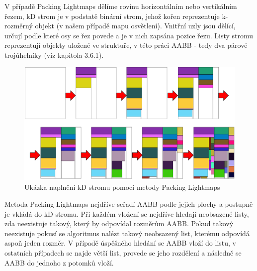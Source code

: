 \documentclass[11pt,twoside,a4paper]{book}
\begin{document}
V případě Packing Lightmaps dělíme rovinu horizontálním nebo vertikálním řezem, kD strom je v podstatě binární strom, jehož kořen reprezentuje k-rozměrný objekt (v našem případě mapu osvětlení). Vnitřní uzly jsou dělící, určují podle které osy se řez povede a je v nich zapsána pozice řezu. Listy stromu reprezentují objekty uložené ve struktuře, v této práci AABB - tedy dva párové trojúhelníky (viz kapitola 3.6.1).

\begin{center}
\begin{figure}[h]
\includegraphics[width=120mm]{figures/kd.png}
\caption{Ukázka naplnění kD stromu pomocí metody Packing Lightmaps}
\end{figure}
\end{center}

Metoda Packing Lightmaps nejdříve seřadí AABB podle jejich plochy a postupně je vkládá do kD stromu. Při každém vložení se nejdříve hledají neobsazené listy, zda neexistuje takový, který by odpovídal rozměrům AABB. Pokud takový neexistuje pokusí se algoritmus nalézt takový neobsazený list, kterému odpovídá aspoň jeden rozměr. V případě úspěšného hledání se AABB vloží do listu, v ostatních případech se najde větší list, provede se jeho rozdělení a následně se AABB do jednoho z potomků vloží.
\newpage
\end{document}
